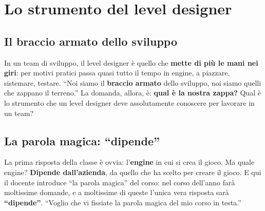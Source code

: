 \section{Lo strumento del level designer}
\label{gd8:sec:strumento}



\subsection{Il braccio armato dello sviluppo}

In un team di sviluppo, il level designer è quello che \textbf{mette di più
le mani nei giri}: per motivi pratici passa quasi tutto il tempo in engine, a
piazzare, sistemare, testare. ``Noi siamo il \textbf{braccio armato} dello
sviluppo, noi siamo quelli che zappano il terreno.'' La domanda, allora, è:
\textbf{qual è la nostra zappa?} Qual è lo strumento che un level designer
deve assolutamente conoscere per lavorare in un team?

\subsection{La parola magica: ``dipende''}

La prima risposta della classe è ovvia: l'\textbf{engine} in cui si crea il
gioco. Ma quale engine? \textbf{Dipende dall'azienda}, da quello che ha scelto
per creare il gioco. E qui il docente introduce ``la parola magica'' del corso:
nel corso dell'anno farà moltissime domande, e a moltissime di queste l'unica
vera risposta sarà \textbf{``dipende''}. ``Voglio che vi fissiate la parola
magica del mio corso in testa.''

